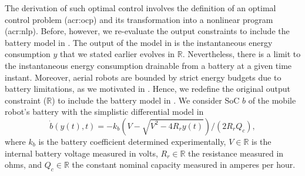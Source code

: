 The derivation of such optimal control involves the definition of an optimal control problem (\Gls{acr:ocp}) and its transformation into a nonlinear program (\Gls{acr:nlp}). Before, however, we re-evaluate the output constraints to include the battery model in . 
The output of the model in  is the instantaneous energy consumption $y$ that we stated earlier evolves in $\mathbb{R}$. Nevertheless, there is a limit to the instantaneous energy consumption drainable from a battery at a given time instant. Moreover, aerial robots are bounded by strict energy budgets due to battery limitations, as we motivated in . Hence, we redefine the original output constraint ($\mathbb{R}$) to include the battery model in . We consider SoC $b$ of the mobile robot's battery with the simplistic differential model in 
\begin{equation}\label{eq:bat}
  \dot{b}(y(t),t)=-k_b\left(V-
  \sqrt{
    V^2-
    4R_ry(t)}
  \right)/(2R_rQ_c),
\end{equation}
where $k_b$ is the battery coefficient determined experimentally,  $V\in\mathbb{R}$ is the internal battery voltage measured in volts, $R_r\in\mathbb{R}$ the resistance measured in ohms, and $Q_c\in\mathbb{R}$ the constant nominal capacity measured in amperes per hour. 

